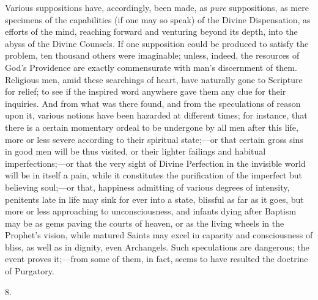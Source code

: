 Various suppositions have, accordingly, been made, as \emph{pure}
suppositions, as mere specimens of the capabilities (if one may so
speak) of the Divine Dispensation, as efforts of the mind, reaching
forward and venturing beyond its depth, into the abyss of the Divine
Counsels. If one supposition could be produced to satisfy the problem,
ten thousand others were imaginable; unless, indeed, the
resources of God's Providence are exactly commensurate with man's
discernment of them. Religious men, amid these searchings of heart,
have naturally gone to Scripture for relief; to see if the inspired
word anywhere gave them any clue for their inquiries. And from what
was there found, and from the speculations of reason upon it, various
notions have been hazarded at different times; for instance, that
there is a certain momentary ordeal to be undergone by all men after
this life, more or less severe according to their spiritual state;—or
that certain gross sins in good men will be thus visited, or their
lighter failings and habitual imperfections;—or that the very sight
of Divine Perfection in the invisible world will be in itself a pain,
while it constitutes the purification of the imperfect but believing
soul;—or that, happiness admitting of various degrees of intensity,
penitents late in life may sink for ever into a state, blissful as far
as it goes, but more or less approaching to unconsciousness, and
infants dying after Baptism may be as gems paving the courts of
heaven, or as the living wheels in the Prophet's vision, while matured
Saints may excel in capacity and consciousness of bliss, as well as in
dignity, even Archangels. Such speculations are dangerous; the event
proves it;—from some of them, in fact, seems to have resulted the
doctrine of Purgatory.

8.

